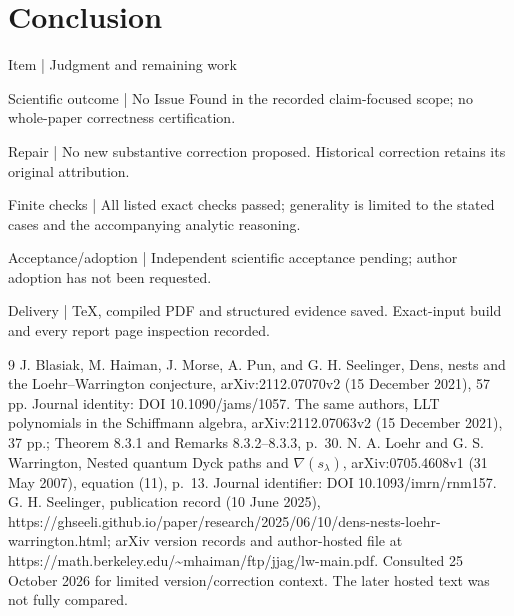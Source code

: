 \documentclass[10pt]{article}
\begin{document}
\section*{Conclusion}
Item | Judgment and remaining work\par
Scientific outcome | No Issue Found in the recorded claim-focused scope; no whole-paper correctness certification.\par
Repair | No new substantive correction proposed. Historical correction retains its original attribution.\par
Finite checks | All listed exact checks passed; generality is limited to the stated cases and the accompanying analytic reasoning.\par
Acceptance/adoption | Independent scientific acceptance pending; author adoption has not been requested.\par
Delivery | TeX, compiled PDF and structured evidence saved. Exact-input build and every report page inspection recorded.\par
9 J. Blasiak, M. Haiman, J. Morse, A. Pun, and G. H. Seelinger, Dens, nests and the Loehr–Warrington conjecture, arXiv:2112.07070v2 (15 December 2021), 57 pp. Journal identity: DOI 10.1090/jams/1057. The same authors, LLT polynomials in the Schiffmann algebra, arXiv:2112.07063v2 (15 December 2021), 37 pp.; Theorem 8.3.1 and Remarks 8.3.2–8.3.3, p. 30. N. A. Loehr and G. S. Warrington, Nested quantum Dyck paths and \(\nabla(s_\lambda)\), arXiv:0705.4608v1 (31 May 2007), equation (11), p. 13. Journal identifier: DOI 10.1093/imrn/rnm157. G. H. Seelinger, publication record (10 June 2025), https://ghseeli.github.io/paper/research/2025/06/10/dens-nests-loehr-warrington.html; arXiv version records and author-hosted file at https://math.berkeley.edu/\textasciitilde{}mhaiman/ftp/jjag/lw-main.pdf. Consulted 25 October 2026 for limited version/correction context. The later hosted text was not fully compared.\par
\end{document}

